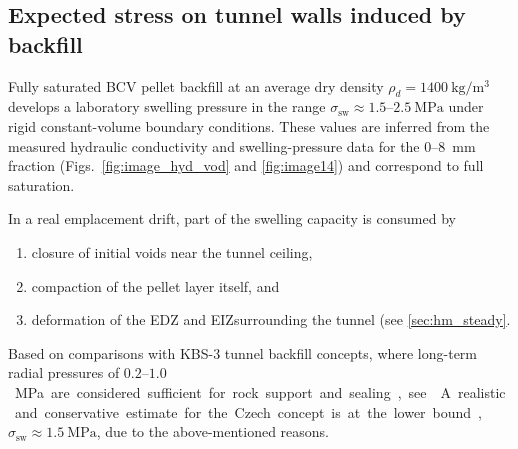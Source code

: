 \subsection{Expected stress on tunnel walls induced by backfill}

Fully saturated \acrshort{BCV} pellet backfill at an average dry density 
$\rho_d = 1400~\mathrm{kg/m^3}$ develops a laboratory swelling pressure in the range
$\sigma_{\text{sw}} \approx 1.5\text{–}2.5~\mathrm{MPa}$ under rigid constant-volume 
boundary conditions. These values are inferred from the measured hydraulic conductivity 
and swelling-pressure data for the 0--8~mm fraction (Figs.~\ref{fig:image_hyd_vod} and 
\ref{fig:image14}) and correspond to full saturation.

In a real emplacement drift, part of the swelling capacity is consumed by
\begin{enumerate}
    \item closure of initial voids near the tunnel ceiling, 
    \item compaction of the pellet layer itself, and  
    \item deformation of the \Gls{EDZ} and \Gls{EIZ}surrounding the tunnel (see \ref{sec:hm_steady}.
\end{enumerate}


Based on comparisons with KBS-3 tunnel backfill concepts, where long-term radial pressures 
of $0.2\text{–}1.0$~\unit\MPa~ are considered sufficient for rock support and sealing, see \cite{SKB:2010:TR-10-12}
A realistic and conservative estimate for the Czech concept is at the lower bound, $\sigma_{\text{sw}} \approx \SI{1.5}{\MPa}$, due to the above-mentioned reasons.



